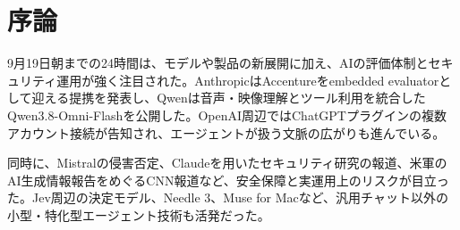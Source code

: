 \section*{序論}
9月19日朝までの24時間は、モデルや製品の新展開に加え、AIの評価体制とセキュリティ運用が強く注目された。AnthropicはAccentureをembedded evaluatorとして迎える提携を発表し、Qwenは音声・映像理解とツール利用を統合したQwen3.8-Omni-Flashを公開した。OpenAI周辺ではChatGPTプラグインの複数アカウント接続が告知され、エージェントが扱う文脈の広がりも進んでいる。

同時に、Mistralの侵害否定、Claudeを用いたセキュリティ研究の報道、米軍のAI生成情報報告をめぐるCNN報道など、安全保障と実運用上のリスクが目立った。Jev周辺の決定モデル、Needle 3、Muse for Macなど、汎用チャット以外の小型・特化型エージェント技術も活発だった。
